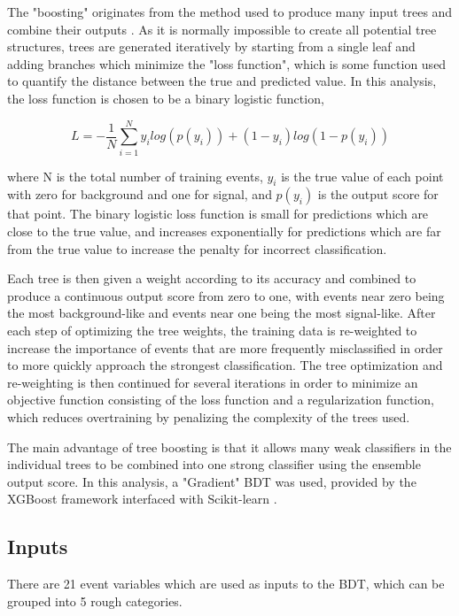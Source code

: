 The "boosting" originates from the method used to produce many input trees and combine their outputs \cite{GradBoost}. 
As it is normally impossible to create all potential tree structures, trees are generated iteratively by starting from a single leaf and adding branches which minimize the "loss function", which is some function used to quantify the distance between the true and predicted value.
In this analysis, the loss function is chosen to be a binary logistic function,

\begin{equation}
	\label{binLogFunc}
	L = - \frac{1}{N} \sum_{i=1}^{N} y_i log(p(y_i)) + (1-y_i) log(1-p(y_i))
\end{equation} 

where N is the total number of training events, $y_i$ is the true value of each point with zero for background and one for signal, and $p(y_i)$ is the output score for that point.
The binary logistic loss function is small for predictions which are close to the true value, and increases exponentially for predictions which are far from the true value to increase the penalty for incorrect classification.

Each tree is then given a weight according to its accuracy and combined to produce a continuous output score from zero to one, with events near zero being the most background-like and events near one being the most signal-like. 
After each step of optimizing the tree weights, the training data is re-weighted to increase the importance of events that are more frequently misclassified in order to more quickly approach the strongest classification.
The tree optimization and re-weighting is then continued for several iterations in order to minimize an objective function consisting of the loss function and a regularization function, which reduces overtraining by penalizing the complexity of the trees used.

The main advantage of tree boosting is that it allows many weak classifiers in the individual trees to be combined into one strong classifier using the ensemble output score.
In this analysis, a "Gradient" BDT was used, provided by the XGBoost framework \cite{XGBoost} interfaced with Scikit-learn \cite{scikit}. 

\subsection{Inputs}
There are 21 event variables which are used as inputs to the BDT, which can be grouped into 5 rough categories.

